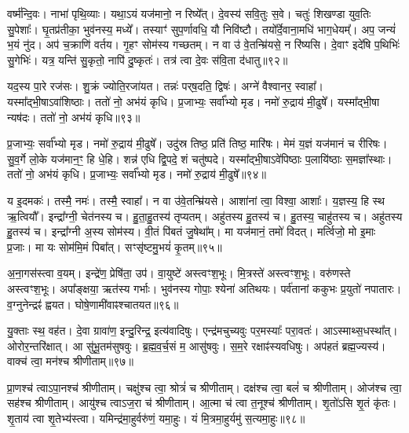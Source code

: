 वर्ष्म॑न्दि॒वः।
नाभा॑ पृथि॒व्याः।
यथा॒ऽयं यज॑मानो॒ न रिष्ये᳚त्।
दे॒वस्य॑ सवि॒तुः स॒वे।
चतुः॑ शिखण्डा युव॒तिः सु॒पेशाः᳚।
घृ॒तप्र॑तीका॒ भुव॑नस्य॒ मध्ये᳚।
तस्याꣳ॑ सुप॒र्णावधि॒ यौ निवि॑ष्टौ।
तयो᳚र्दे॒वाना॒मधि॑ भाग॒धेयम्᳚।
अप॒ जन्यं॑ भ॒यं नु॑द।
अप॑ च॒क्राणि॑ वर्तय।
गृ॒हꣳ सोम॑स्य गच्छतम्।
न वा उ॑ वे॒तन्म्रि॑यसे॒ न रि॑ष्यसि।
दे॒वाꣳ इदे॑षि प॒थिभिः॑ सु॒गेभिः॑।
यत्र॒ यन्ति॑ सु॒कृतो॒ नापि॑ दु॒ष्कृतः॑।
तत्र॑ त्वा दे॒वः स॑वि॒ता द॑धातु॥९२॥\ip{}

यद॒स्य पा॒रे रज॑सः।
शु॒क्रं  ज्योति॒रजा॑यत।
तन्नः॑ पर्‌\mbox{}ष॒दति॒ द्विषः॑।
अग्ने॑ वैश्वानर॒ स्वाहा᳚।
यस्मा᳚द्भी॒षा\-ऽवा॑शिष्ठाः।
ततो॑ नो॒ अभ॑यं कृधि।
प्र॒जाभ्यः॒ सर्वा᳚भ्यो मृड।
नमो॑ रु॒द्राय॑ मी॒ढुषे᳚।
यस्मा᳚द्भी॒षा न्यष॑दः।
ततो॑ नो॒ अभ॑यं कृधि॥९३॥\ip

प्र॒जाभ्यः॒ सर्वा᳚भ्यो मृड।
नमो॑ रु॒द्राय॑ मी॒ढुषे᳚।
उदु॑स्र तिष्ठ॒ प्रति॑ तिष्ठ॒ मारि॑षः।
मेमं य॒ज्ञं यज॑मानं च रीरिषः।
सु॒व॒र्गे लो॒के यज॑मान॒ꣳ॒ हि धे॒हि।
शन्न॑ एधि द्वि॒पदे॒ शं चतु॑ष्पदे।
यस्मा᳚द्भी॒षा\-ऽवे॑पिष्ठाः प॒लायि॑ष्ठाः स॒मज्ञा᳚स्थाः।
ततो॑ नो॒ अभ॑यं कृधि।
प्र॒जाभ्यः॒ सर्वा᳚भ्यो मृड।
नमो॑ रु॒द्राय॑ मी॒ढुषे᳚॥९४॥\ip

य इ॒दमकः॑।
तस्मै॒ नमः॑।
तस्मै॒ स्वाहा᳚।
न वा उ॑वे॒तन्म्रि॑यसे।
आशा॑नां त्वा॒ विश्वा॒ आशाः᳚।
य॒ज्ञस्य॒ हि स्थ ऋ॒त्वियौ᳚।
इन्द्रा᳚ग्नी॒ चेत॑नस्य च।
हु॒ता॒हु॒तस्य॑ तृप्यतम्।
अहु॑तस्य हु॒तस्य॑ च।
हु॒तस्य॒ चाहु॑तस्य च।
अहु॑तस्य हु॒तस्य॑ च।
इन्द्रा᳚ग्नी अ॒स्य सोम॑स्य।
वी॒तं पि॑बतं जु॒षेथा᳚म्।
मा यज॑मानं॒ तमो॑ विदत्।
मर्त्विजो॒ मो इ॒माः प्र॒जाः।
मा यः सोम॑मि॒मं पिबा᳚त्।
सꣳसृ॑ष्टमु॒भयं॑ कृ॒तम्॥९५॥\ip\anuvakamend[कृ॒धि॒ मी॒ढुषे\-ऽहु॑तस्य च स॒प्त च॑]

अ॒ना॒गस॑स्त्वा व॒यम्।
इन्द्रे॑ण॒ प्रेषि॑ता॒ उप॑।
वा॒युष्टे॑ अस्त्वꣳश॒भूः।
मि॒त्रस्ते॑ अस्त्वꣳश॒भूः।
वरु॑णस्ते अस्त्वꣳश॒भूः।
अपा᳚ङ्क्षया॒ ऋत॑स्य गर्भाः।
भुव॑नस्य गोपाः॒ श्येना॑ अतिथयः।
पर्व॑तानां ककुभः प्र॒युतो॑ नपातारः।
व॒ग्नुनेन्द्रꣴ॑ ह्वयत।
घोषे॒णामी॑वाꣴश्चातयत॥९६॥\ip

यु॒क्ताः स्थ॒ वह॑त।
दे॒वा ग्रावा॑ण॒ इन्दु॒रिन्द्र॒ इत्य॑वादिषुः।
एन्द्र॑मचुच्यवुः पर॒मस्याः᳚ परा॒वतः॑।
आऽस्माथ्स॒धस्था᳚त्।
ओरोर॒न्तरि॑क्षात्।
आ सु॑भू॒तम॑सुषवुः।
ब्र॒ह्म॒व॒र्च॒सं म॒ आसु॑षवुः।
स॒म॒रे रक्षाꣴ॑स्यवधिषुः।
अप॑हतं ब्रह्म॒ज्यस्य॑।
वाक्च॑ त्वा॒ मन॑श्च श्रीणीताम्॥९७॥\ip

प्रा॒णश्च॑ त्वा\-ऽपा॒नश्च॑ श्रीणीताम्।
चक्षु॑श्च त्वा॒ श्रोत्रं॑ च श्रीणीताम्।
दक्ष॑श्च त्वा॒ बलं॑ च श्रीणीताम्।
ओज॑श्च त्वा॒ सह॑श्च श्रीणीताम्।
आयु॑श्च त्वा\-ऽज॒रा च॑ श्रीणीताम्।
आ॒त्मा च॑ त्वा त॒नूश्च॑ श्रीणीताम्।
शृ॒तो॑ऽसि शृ॒तं कृ॑तः।
शृ॒ताय॑ त्वा शृ॒तेभ्य॑स्त्वा।
यमिन्द्र॑मा॒हुर्वरु॑णं॒ यमा॒हुः।
यं मि॒त्रमा॒हुर्यमु॑ स॒त्यमा॒हुः॥९८॥\ip

